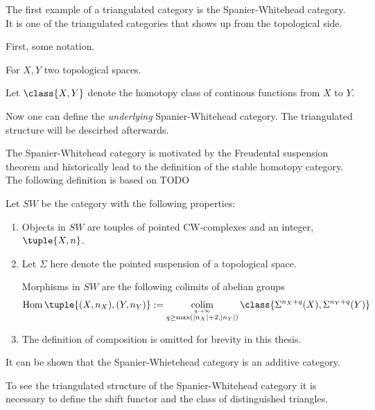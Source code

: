 The first example of a triangulated category is the Spanier-Whitehead category. It is one of the triangulated categories that shows up from the topological side.

First, some notation.
\begin{notation}
    For \( X, Y \) two topological spaces.

    Let \( \class{ X, Y } \) denote the homotopy class of continous functions from \( X \) to \( Y \).
\end{notation}

Now one can define the \emph{underlying} Spanier-Whitehead category. The triangulated structure will be descirbed afterwards.

The Spanier-Whitehead category is motivated by the Freudental suspension theorem and historically lead to the definition of the stable homotopy category. The following definition is based on TODO

\begin{definition}
    \label{def:sw-cat}
    Let \( SW \) be the category with the following properties:
    \begin{enumerate}
        \item {
            Objects in \( SW \) are touples of pointed CW-complexes and an integer, \( \tuple{X, n} \).
        }
        \item {
            Let \( \Sigma \) here denote the pointed suspension of a topological space.

            Morphisms in \( SW \) are the following colimits of abelian groups
            \[
                \Hom\tuple{ (X, n_X), (Y, n_Y) } := \colim_{\stackrel{q \to \infty}{q \geq \max(|n_X| + 2, |n_Y|)}} \class{ \Sigma^{n_X + q}(X), \Sigma^{n_Y + q}(Y) }
            \]
        }
        \item {
            The definition of composition is omitted for brevity in this thesis.
        }
    \end{enumerate}
\end{definition}

It can be shown that the Spanier-Whietehead category is an additive category.

To see the triangulated structure of the Spanier-Whitehead category it is necessary to define the shift functor and the class of distinguished triangles.

